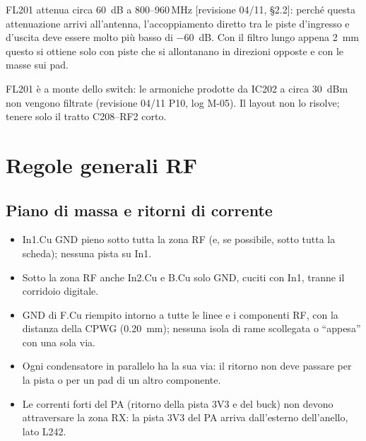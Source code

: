 \documentclass[a4paper,10pt]{article}
\newcommand{\fonte}[1]{{\footnotesize\color{sbgray}[#1]}}
\newcounter{regola}
\begin{document}
\begin{perche}
FL201 attenua circa \SI{60}{dB} a 800--960\,MHz \fonte{revisione 04/11, \S2.2}: perché questa attenuazione
arrivi all'antenna, l'accoppiamento diretto tra le piste d'ingresso e d'uscita deve essere molto più
basso di \SI{-60}{dB}. Con il filtro lungo appena \SI{2}{mm} questo si ottiene solo con piste che si
allontanano in direzioni opposte e con le masse sui pad.
\end{perche}

\begin{attenzione}
FL201 è a monte dello switch: le armoniche prodotte da IC202 a circa \SI{30}{dBm} non vengono filtrate
(revisione 04/11 P10, log M-05). Il layout non lo risolve; tenere solo il tratto C208--RF2 corto.
\end{attenzione}

\section{Regole generali RF}
\label{sec:generali}

\subsection{Piano di massa e ritorni di corrente}
\begin{regola}[GND]
\begin{itemize}
\item In1.Cu GND pieno sotto tutta la zona RF (e, se possibile, sotto tutta la scheda); nessuna pista su In1.
\item Sotto la zona RF anche In2.Cu e B.Cu solo GND, cuciti con In1, tranne il corridoio digitale.
\item GND di F.Cu riempito intorno a tutte le linee e i componenti RF, con la distanza della CPWG
      (\SI{0.20}{mm}); nessuna isola di rame scollegata o \enquote{appesa} con una sola via.
\item Ogni condensatore in parallelo ha la sua via: il ritorno non deve passare per la pista o per un pad
      di un altro componente.
\item Le correnti forti del PA (ritorno della pista 3V3 e del buck) non devono attraversare la zona RX:
      la pista 3V3 del PA arriva dall'esterno dell'anello, lato L242.
\end{itemize}
\end{regola}
\end{document}

